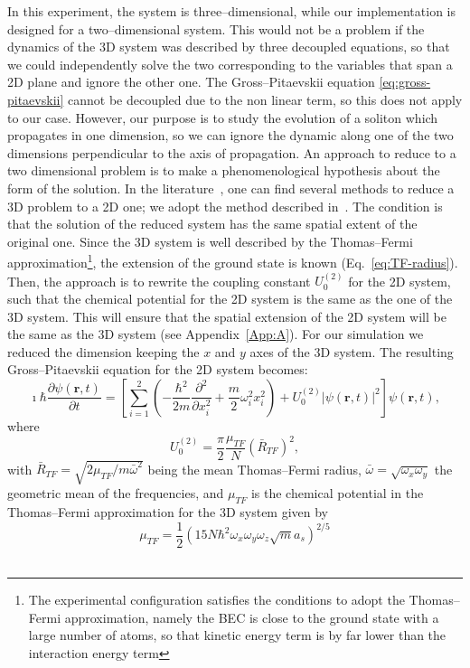 In this experiment, the system is three--dimensional, while our implementation is designed for a two--dimensional system. This would not be a problem if the dynamics of the 3D system was described by three decoupled equations, so that we could independently solve the two corresponding to the variables that span a 2D plane and ignore the other one. The Gross--Pitaevskii equation \eqref{eq:gross-pitaevskii} cannot be decoupled due to the non linear term, so this does not apply to our case. However, our purpose is to study the evolution of a soliton which propagates in one dimension, so we can ignore the dynamic along one of the two dimensions perpendicular to the axis of propagation. An approach to reduce to a two dimensional problem is to make a phenomenological hypothesis about the form of the solution. In the literature~\citep{JKP98,SZ98,Sal01,SPR02,MM03}, one can find several methods to reduce a 3D problem to a 2D one; we adopt the method described in~\citep{PietroMassignan}. The condition is that the solution of the reduced system has the same spatial extent of the original one. Since the 3D system is well described by the Thomas--Fermi approximation\footnote{The experimental configuration satisfies the conditions to adopt the Thomas--Fermi approximation, namely the BEC is close to the ground state with a large number of atoms, so that kinetic energy term is by far lower than the interaction energy term}, the extension of the ground state is known (Eq.~\eqref{eq:TF-radius}). Then, the approach is to rewrite the coupling constant $U_0^{(2)}$ for the 2D system, such that the chemical potential for the 2D system is the same as the one of the 3D system. This will ensure that the spatial extension of the 2D system will be the same as the 3D system (see Appendix~\ref{App:A}). For our simulation we reduced the dimension keeping the $x$ and $y$ axes of the 3D system. The resulting Gross--Pitaevskii equation for the 2D system becomes:
\begin{equation} \label{eq:gross-pitaevskii-simulation}
\imath \hbar \frac{\partial \psi(\textbf{r}, t)}{\partial t} = \left[ \sum_{i=1}^2 \left( -\frac{\hbar^2}{2m} \frac{\partial^2}{\partial x_i^2} + \frac{m}{2} \omega_i^2 x_i^2 \right) + U_0^{(2)} |\psi(\textbf{r}, t)|^2 \right] \psi(\textbf{r}, t),
\end{equation}
where
\begin{equation}
U_0^{(2)} = \frac{\pi}{2} \frac{\mu_{TF}}{N} \left( \bar{R}_{TF} \right)^2 ,
\end{equation}
with $\bar{R}_{TF} = \sqrt{2\mu_{TF} / m \bar{\omega}^2}$ being the mean Thomas--Fermi radius, $\bar{\omega} = \sqrt{ \omega_x \omega_y}$ the geometric mean of the frequencies,
and $\mu_{TF}$ is the chemical potential in the Thomas--Fermi approximation for the 3D system given by
\begin{equation}
\mu_{TF} = \frac{1}{2} \left( 15 N \hbar^2 \omega_x \omega_y \omega_z \sqrt{m} a_s \right)^{2/5}
\end{equation}
\\

